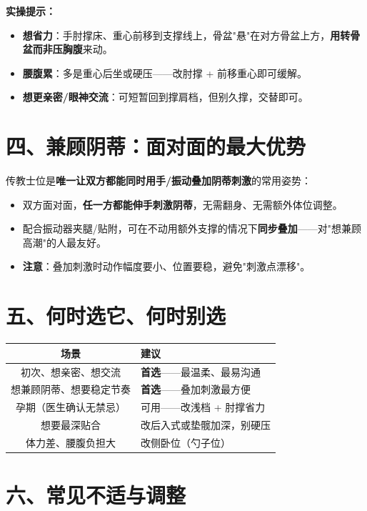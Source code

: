 \documentclass[12pt,UTF8,openany]{ctexbook}
\begin{document}
\noindent\textbf{实操提示：}
\begin{itemize}[leftmargin=2em,itemsep=0.3em]
  \item \textbf{想省力}：手肘撑床、重心前移到支撑线上，骨盆"悬"在对方骨盆上方，\textbf{用转骨盆而非压胸腹}来动。
  \item \textbf{腰腹累}：多是重心后坐或硬压——改肘撑 + 前移重心即可缓解。
  \item \textbf{想更亲密/眼神交流}：可短暂回到撑肩档，但别久撑，交替即可。
\end{itemize}

\section{四、兼顾阴蒂：面对面的最大优势}

传教士位是\textbf{唯一让双方都能同时用手/振动叠加阴蒂刺激}的常用姿势：

\begin{itemize}[leftmargin=2em,itemsep=0.3em]
  \item 双方面对面，\textbf{任一方都能伸手刺激阴蒂}，无需翻身、无需额外体位调整。
  \item 配合振动器夹腿/贴附，可在不动用额外支撑的情况下\textbf{同步叠加}——对"想兼顾高潮"的人最友好。
  \item \textbf{注意}：叠加刺激时动作幅度要小、位置要稳，避免"刺激点漂移"。
\end{itemize}

\section{五、何时选它、何时别选}

\begin{tabularx}{\textwidth}{C X}
\toprule
场景 & 建议 \\
\midrule
初次、想亲密、想交流 & \textbf{首选}——最温柔、最易沟通 \\
想兼顾阴蒂、想要稳定节奏 & \textbf{首选}——叠加刺激最方便 \\
孕期（医生确认无禁忌） & 可用——改浅档 + 肘撑省力 \\
想要最深贴合 & 改后入式或垫髋加深，别硬压 \\
体力差、腰腹负担大 & 改侧卧位（勺子位） \\
\bottomrule
\end{tabularx}

\section{六、常见不适与调整}
\end{document}
